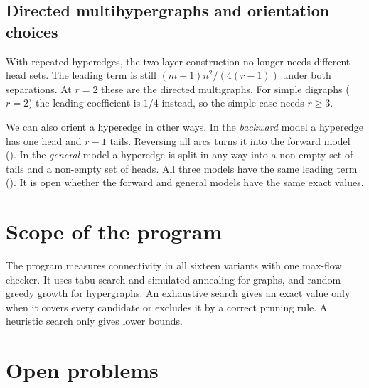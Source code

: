 \subsection{Directed multihypergraphs and orientation choices}
\label{sec:status-directed-multihypergraph}\label{sec:orientation-models}

With repeated hyperedges, the two-layer construction no longer needs different head sets.
The leading term is still $(m-1)n^2/(4(r-1))$ under both separations.
At $r=2$ these are the directed multigraphs.
For simple digraphs ($r=2$) the leading coefficient is $1/4$ instead, so the simple case needs $r\ge3$.

We can also orient a hyperedge in other ways.
In the \emph{backward} model a hyperedge has one head and $r-1$ tails.
Reversing all arcs turns it into the forward model ().
In the \emph{general} model a hyperedge is split in any way into a non-empty set of tails and a non-empty set of heads.
All three models have the same leading term ().
It is open whether the forward and general models have the same exact values.





\section{Scope of the program}

The program measures connectivity in all sixteen variants with one max-flow checker.
It uses tabu search and simulated annealing for graphs, and random greedy growth for hypergraphs.
An exhaustive search gives an exact value only when it covers every candidate or excludes it by a correct pruning rule.
A heuristic search only gives lower bounds.



\section{Open problems}

